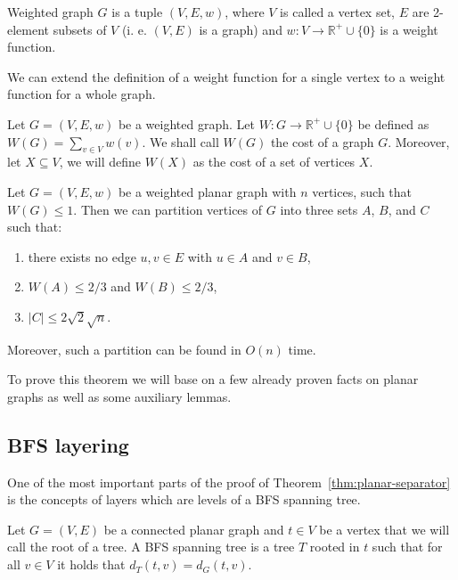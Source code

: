\begin{defn} \label{defn:weighted}
    Weighted graph $G$ is a tuple $(V, E, w)$, where $V$ is called
    a vertex set, $E$ are 2-element subsets of $V$ (i. e. $(V, E)$ is a graph) and $w \colon V \rightarrow \mathbb{R}^+ \cup \{0\}$
    is a weight function.
\end{defn}

We can extend the definition of a weight function for a single vertex to a weight 
function for a whole graph.

\begin{defn} \label{defn:cost-fun}
    Let $G = (V, E, w)$ be a weighted graph. Let $W \colon G \rightarrow \mathbb{R}^+ \cup \{0\}$
    be defined as $W(G) = \sum_{v \in V} w(v)$. We shall call $W(G)$ the cost of a graph $G$.
    Moreover, let $X \subseteq V$, we will define $W(X)$ as the cost of a set of vertices $X$.
\end{defn}


\begin{theorem}\label{thm:planar-separator}
	Let $G = (V, E, w)$ be a weighted planar graph with $n$ vertices, such that
    $W(G) \leq 1$. Then we can partition
	vertices of $G$ into three sets $A$, $B$, and $C$ such that:
    \begin{enumerate}
        \item[(a)] there exists no edge ${u, v} \in E$ with $u \in A$ and $v \in B$,
        \item[(b)] $W(A) \leq 2/3$ and $W(B) \leq 2/3$,
        \item[(c)] $|C| \leq 2\sqrt{2}\sqrt{n}$. 
    \end{enumerate}
	
    \noindent
	Moreover, such a partition can be found in $O(n)$ time.
\end{theorem}

To prove this theorem we will base on a few already proven facts on planar
graphs as well as some auxiliary lemmas.

\subsection{BFS layering} \label{section:bfs}
One of the most important parts of the proof of
Theorem~\ref{thm:planar-separator} is the concepts of layers which are levels of
a BFS spanning tree.
\begin{defn}
    Let $G = (V, E)$ be a connected planar graph and $t \in V$ be a vertex that we
    will call the root of a tree. A BFS spanning tree is a tree $T$ rooted in
    $t$ such that for all $v \in V$ it holds that $d_T(t, v) = d_G(t, v)$.
\end{defn}

